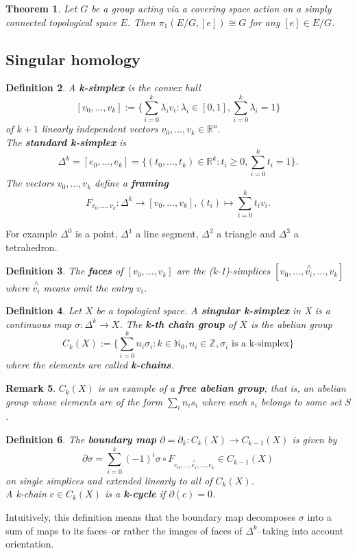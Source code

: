 \documentclass{article}
\newtheorem{theorem}{Theorem}[section]
\newtheorem{definition}[theorem]{Definition}
\newtheorem{remark}[theorem]{Remark}
\begin{document}
\begin{theorem}
Let $G$ be a group acting via a covering space action on a simply connected topological space $E$. Then $\pi_1(E/G,[e])\cong G$ for any $[e]\in E/G$.
\end{theorem}

\subsection{Singular homology}
\begin{definition}
A \textbf{k-simplex} is the convex hull\[[v_0,...,v_k]:=\{\sum_{i=0}^k\lambda_iv_i:\lambda_i\in [0,1],\sum_{i=0}^k\lambda_i=1\}\]
of $k+1$ linearly independent vectors $v_0,...,v_k\in\mathbb{R}^n$.\\
The \textbf{standard k-simplex} is\[\Delta^k=[e_0,...,e_k]=\{(t_0,...,t_k)\in\mathbb{R}^k:t_i\geq 0, \sum_{i=0}^kt_i=1\}.\]
The vectors $v_0,...,v_k$ define a \textbf{framing} \[F_{v_0,...,v_k}\colon\Delta^k\rightarrow [v_0,...,v_k],(t_i)\mapsto \sum_{i=0}^kt_iv_i.\]
\end{definition}


\noindent For example $\Delta^0$ is a point, $\Delta^1$ a line segment, $\Delta^2$ a triangle and $\Delta^3$ a tetrahedron.

\begin{definition}
The \textbf{faces} of $[v_0,...,v_k]$ are the (k-1)-simplices $[v_0,...,\overset{\wedge}{v_i},...,v_k]$ where $\overset{\wedge}{v_i}$ means omit the entry $v_i$.
\end{definition}

\begin{definition}
Let $X$ be a topological space. A \textbf{singular k-simplex} in X is a continuous map $\sigma\colon\Delta^k\to X$. The \textbf{k-th chain group} of $X$ is the abelian group\[C_k(X):=\{\sum_{i=0}^kn_i\sigma_i:k\in\mathbb{N}_0,n_i\in\mathbb{Z},\sigma_i \text{ is a k-simplex}\}\] where the elements are called \textbf{k-chains}.
\end{definition}
\begin{remark}
$C_k(X)$ is an example of a \textbf{free abelian group}; that is, an abelian group whose elements are of the form $\sum_in_is_i$ where each $s_i$ belongs to some set $S$.
\end{remark}


\begin{definition}
The \textbf{boundary map} $\partial=\partial_k\colon C_k(X)\to C_{k-1}(X)$ is given by\[\partial\sigma=\sum_{i=0}^k(-1)^i\sigma\circ F_{e_0,...,\overset{\wedge}{e_i},...,e_k}\in C_{k-1}(X)\]
on single simplices and extended linearly to all of $C_k(X)$.\\
A k-chain $c\in C_k(X)$ is a \textbf{k-cycle} if $\partial(c)=0$.
\end{definition}
\noindent Intuitively, this definition means that the boundary map decomposes $\sigma$ into a sum of maps to its faces--or rather the images of faces of $\Delta^k$--taking into account orientation.
\end{document}
